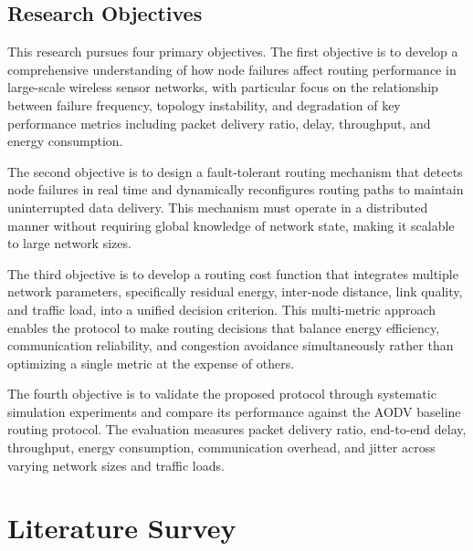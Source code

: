 \documentclass[a4paper,fleqn]{cas-dc}
\numberwithin{equation}{section}
\begin{document}
\subsection{Research Objectives}

This research pursues four primary objectives. The first objective is to develop a comprehensive understanding of how node failures affect routing performance in large-scale wireless sensor networks, with particular focus on the relationship between failure frequency, topology instability, and degradation of key performance metrics including packet delivery ratio, delay, throughput, and energy consumption.
 
The second objective is to design a fault-tolerant routing mechanism that detects node failures in real time and dynamically reconfigures routing paths to maintain uninterrupted data delivery. This mechanism must operate in a distributed manner without requiring global knowledge of network state, making it scalable to large network sizes.
 
The third objective is to develop a routing cost function that integrates multiple network parameters, specifically residual energy, inter-node distance, link quality, and traffic load, into a unified decision criterion. This multi-metric approach enables the protocol to make routing decisions that balance energy efficiency, communication reliability, and congestion avoidance simultaneously rather than optimizing a single metric at the expense of others.
 
The fourth objective is to validate the proposed protocol through systematic simulation experiments and compare its performance against the AODV baseline routing protocol. The evaluation measures packet delivery ratio, end-to-end delay, throughput, energy consumption, communication overhead, and jitter across varying network sizes and traffic loads.

\section{Literature Survey}
\end{document}
